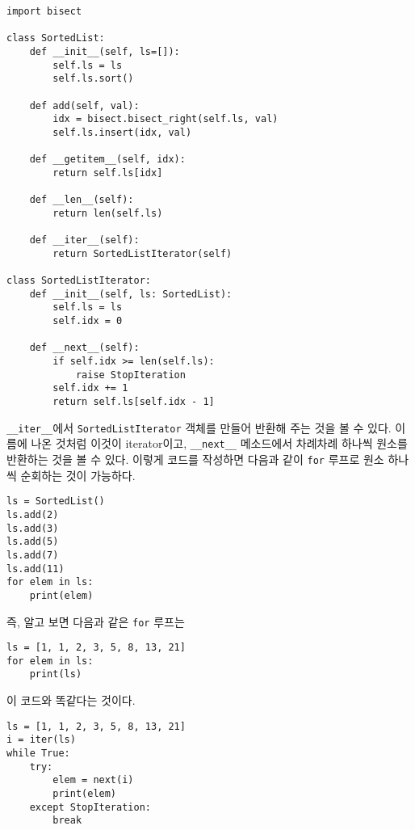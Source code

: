 \documentclass{scrartcl}
\begin{document}
\begin{lstlisting}
import bisect

class SortedList:
    def __init__(self, ls=[]):
        self.ls = ls
        self.ls.sort()

    def add(self, val):
        idx = bisect.bisect_right(self.ls, val)
        self.ls.insert(idx, val)

    def __getitem__(self, idx):
        return self.ls[idx]
    
    def __len__(self):
        return len(self.ls)

    def __iter__(self):
        return SortedListIterator(self)

class SortedListIterator:
    def __init__(self, ls: SortedList):
        self.ls = ls
        self.idx = 0

    def __next__(self):
        if self.idx >= len(self.ls):
            raise StopIteration
        self.idx += 1
        return self.ls[self.idx - 1]
\end{lstlisting}
\texttt{\_\_iter\_\_}에서 \texttt{SortedListIterator} 객체를 만들어 반환해 주는 것을 볼 수 있다. 이름에 나온 것처럼 이것이 iterator이고, \texttt{\_\_next\_\_} 메소드에서 차례차례 하나씩 원소를 반환하는 것을 볼 수 있다. 이렇게 코드를 작성하면 다음과 같이 \texttt{for} 루프로 원소 하나씩 순회하는 것이 가능하다.
\begin{lstlisting}
ls = SortedList()
ls.add(2)
ls.add(3)
ls.add(5)
ls.add(7)
ls.add(11)
for elem in ls:
    print(elem)
\end{lstlisting}
즉, 알고 보면 다음과 같은 \texttt{for} 루프는
\begin{lstlisting}
ls = [1, 1, 2, 3, 5, 8, 13, 21]
for elem in ls:
    print(ls)
\end{lstlisting}
이 코드와 똑같다는 것이다.
\begin{lstlisting}
ls = [1, 1, 2, 3, 5, 8, 13, 21]
i = iter(ls)
while True:
    try:
        elem = next(i)
        print(elem)
    except StopIteration:
        break
\end{lstlisting}
\end{document}
